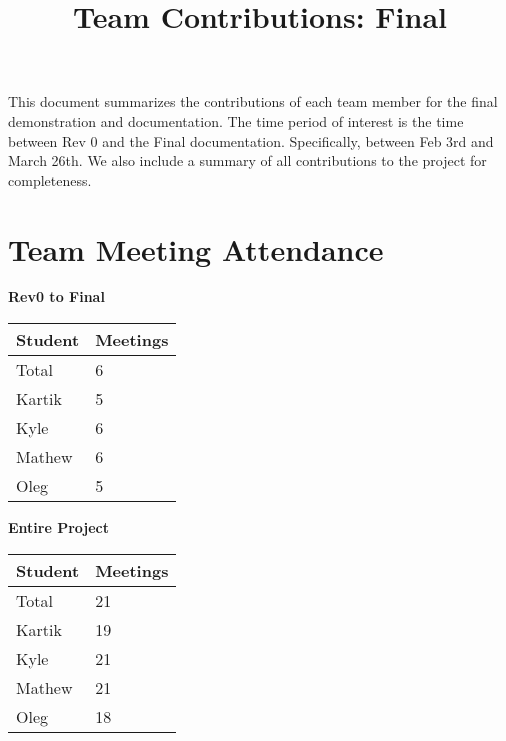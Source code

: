 \documentclass{article}
\title{Team Contributions: Final\\\progname}
\author{\authname}
\date{}
\begin{document}
\maketitle

This document summarizes the contributions of each team member for the final
demonstration and documentation.  The time period of interest is the time
between Rev 0 and the Final documentation. Specifically, between Feb 3rd and March 26th. We also include a summary of all contributions to the project for completeness.


\section{Team Meeting Attendance}



\begin{table}[H]
\centering
\textbf{Rev0 to Final}\\
\begin{tabular}{ll}
\toprule
\textbf{Student} & \textbf{Meetings}\\
\midrule
Total & 6\\
Kartik & 5\\
Kyle & 6\\
Mathew & 6\\
Oleg & 5\\
\bottomrule
\end{tabular}
\end{table}


\begin{table}[H]
\centering
\textbf{Entire Project}\\
\begin{tabular}{ll}
\toprule
\textbf{Student} & \textbf{Meetings}\\
\midrule
Total & 21\\
Kartik & 19\\
Kyle & 21\\
Mathew & 21\\
Oleg & 18\\
\bottomrule
\end{tabular}
\end{table}


\end{document}
